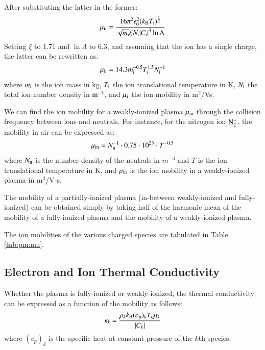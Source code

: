 \documentclass{warpdoc}
\newcommand{\mfd}{\displaystyle}
\begin{document}
After substituting the latter in the former:
%
\begin{equation}
 \mu_{\rm ii} = \frac{16 \pi^2 \epsilon_0^2 (k_{\rm B} T_{\rm i})^\frac{3}{2}}{\mfd \sqrt{m_{\rm i}} \xi  N_{\rm i}  |C_{\rm i}|^3  \ln \Lambda}
\end{equation}
% 
Setting $\xi$ to 1.71 and $\ln \Lambda$ to 6.3, and assuming that the ion has a single charge, the latter can be rewritten as:
%
\begin{equation}
 \mu_{\rm ii} = 14.3 m_{\rm i}^{-0.5} T_{\rm i}^{1.5} N_{\rm i}^{-1}
\end{equation}
% 
where $m_{\rm i}$ is the ion mass in kg, $T_{\rm i}$ the ion translational temperature in K, $N_{\rm i}$ the total ion number density in $\rm m^{-3}$, and $\mu_{\rm i}$ the ion mobility in m$^2$/Vs.


We can find the ion mobility for a weakly-ionized plasma $\mu_{\rm in}$ through the collision frequency between ions and neutrals. For instance, for the nitrogen ion $\rm N_2^+$, the mobility in air can be expressed as:
%
\begin{equation}
\mu_{\rm in}=N_{\rm n}^{-1} \cdot 0.75\cdot 10^{23}\cdot T^{-0.5}
\end{equation}
%
where $N_{\rm n}$ is the number density of the neutrals in $m^{-3}$ and $T$ is the ion translational temperature in K, and $\mu_{\rm in}$ is the ion mobility in a weakly-ionized plasma in m$^2$/V-s.

The mobility of a partially-ionized plasma (in-between weakly-ionized and fully-ionized) can be obtained simply by taking half of the harmonic mean of the mobility of a fully-ionized plasma and the mobility of a weakly-ionized plasma. 

The ion mobilities of the various charged species are tabulated in Table \ref{tab:pm:mu}. 



\subsection{Electron and Ion Thermal Conductivity}

Whether the plasma is fully-ionized or weakly-ionized, the thermal conductivity can be expressed as a function of the mobility as follows:
%
\begin{equation}
\kappa_k =     \frac{ \rho_k k_{\rm B}  (c_p)_k T_k \mu_k}{|C_k|} 
\end{equation}
%
where $(c_p)_k$ is the specific heat at constant pressure of the $k$th species.
\end{document}
